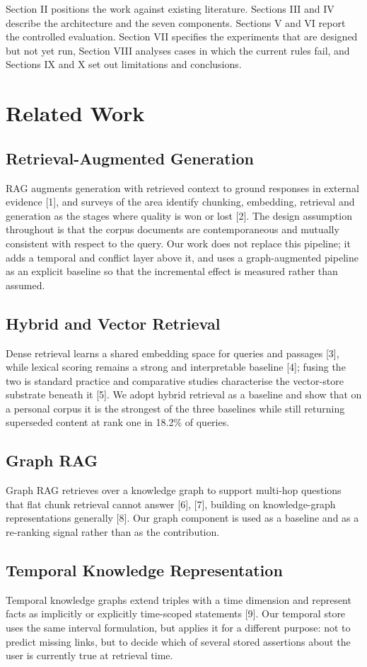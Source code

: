 \documentclass[conference]{IEEEtran}
\begin{document}
Section II positions the work against existing literature. Sections III and IV describe the architecture and the seven components. Sections V and VI report the controlled evaluation. Section VII specifies the experiments that are designed but not yet run, Section VIII analyses cases in which the current rules fail, and Sections IX and X set out limitations and conclusions.
\section{Related Work}
\subsection{Retrieval-Augmented Generation}
RAG augments generation with retrieved context to ground responses in external evidence [1], and surveys of the area identify chunking, embedding, retrieval and generation as the stages where quality is won or lost [2]. The design assumption throughout is that the corpus documents are contemporaneous and mutually consistent with respect to the query. Our work does not replace this pipeline; it adds a temporal and conflict layer above it, and uses a graph-augmented pipeline as an explicit baseline so that the incremental effect is measured rather than assumed.
\subsection{Hybrid and Vector Retrieval}
Dense retrieval learns a shared embedding space for queries and passages [3], while lexical scoring remains a strong and interpretable baseline [4]; fusing the two is standard practice and comparative studies characterise the vector-store substrate beneath it [5]. We adopt hybrid retrieval as a baseline and show that on a personal corpus it is the strongest of the three baselines while still returning superseded content at rank one in 18.2\% of queries.
\subsection{Graph RAG}
Graph RAG retrieves over a knowledge graph to support multi-hop questions that flat chunk retrieval cannot answer [6], [7], building on knowledge-graph representations generally [8]. Our graph component is used as a baseline and as a re-ranking signal rather than as the contribution.
\subsection{Temporal Knowledge Representation}
Temporal knowledge graphs extend triples with a time dimension and represent facts as implicitly or explicitly time-scoped statements [9]. Our temporal store uses the same interval formulation, but applies it for a different purpose: not to predict missing links, but to decide which of several stored assertions about the user is currently true at retrieval time.
\end{document}
